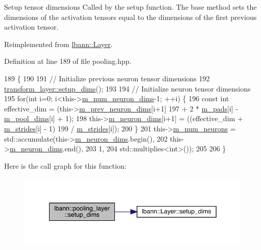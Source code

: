 Setup tensor dimensions Called by the setup function. The base method sets the dimensions of the activation tensors equal to the dimensions of the first previous activation tensor. 

Reimplemented from \hyperlink{classlbann_1_1Layer_a90fce1b06c1f2abb480e18cfe08a9746}{lbann\+::\+Layer}.



Definition at line 189 of file pooling.\+hpp.


\begin{DoxyCode}
189                              \{
190 
191     \textcolor{comment}{// Initialize previous neuron tensor dimensions}
192     \hyperlink{classlbann_1_1Layer_a90fce1b06c1f2abb480e18cfe08a9746}{transform\_layer::setup\_dims}();
193 
194     \textcolor{comment}{// Initialize neuron tensor dimensions}
195     \textcolor{keywordflow}{for}(\textcolor{keywordtype}{int} i=0; i<this->\hyperlink{classlbann_1_1Layer_adfd6178d21498c9095cd947ae1eb2d6a}{m\_num\_neuron\_dims}-1; ++i) \{
196       \textcolor{keyword}{const} \textcolor{keywordtype}{int} effective\_dim = (this->\hyperlink{classlbann_1_1Layer_ae204d1a2a79606eaa117273857ff62a3}{m\_prev\_neuron\_dims}[i+1]
197                                  + 2 * \hyperlink{classlbann_1_1pooling__layer_a22fd39aa4358149110a369ddf0e5ffdb}{m\_pads}[i] - \hyperlink{classlbann_1_1pooling__layer_abb52fe974f602921823a46320fd7d075}{m\_pool\_dims}[i] + 1);
198       this->\hyperlink{classlbann_1_1Layer_abb34bb8031f57a483e2e327a5f229f48}{m\_neuron\_dims}[i+1] = ((effective\_dim + \hyperlink{classlbann_1_1pooling__layer_a754bb6d49b39e915f315ca0049c953d9}{m\_strides}[i] - 1)
199                                   / \hyperlink{classlbann_1_1pooling__layer_a754bb6d49b39e915f315ca0049c953d9}{m\_strides}[i]);
200     \}
201     this->\hyperlink{classlbann_1_1Layer_a6b5ebc8a7d9329d8a773ed787e7b41d8}{m\_num\_neurons} = std::accumulate(this->\hyperlink{classlbann_1_1Layer_abb34bb8031f57a483e2e327a5f229f48}{m\_neuron\_dims}.begin(),
202                                           this->\hyperlink{classlbann_1_1Layer_abb34bb8031f57a483e2e327a5f229f48}{m\_neuron\_dims}.end(),
203                                           1,
204                                           std::multiplies<int>());
205 
206   \}
\end{DoxyCode}
Here is the call graph for this function\+:\nopagebreak
\begin{figure}[H]
\begin{center}
\leavevmode
\includegraphics[width=349pt]{classlbann_1_1pooling__layer_a5de83fe60224067c132b0f1d53024b57_cgraph}
\end{center}
\end{figure}
